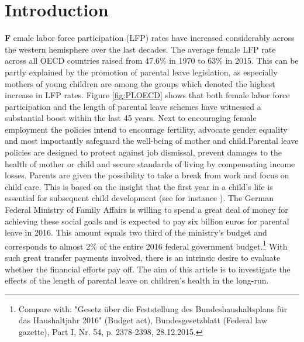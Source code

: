 \documentclass[a4paper ]{article}
\begin{document}
\section{Introduction}
\lettrine[lines=2]{\color{gray}\textbf{F}}{ }emale labor force participation (LFP) rates have increased considerably across the western hemisphere over the last decades. The average female LFP rate across all OECD countries raised from 47.6\% in 1970 to 63\% in 2015. This can be partly explained by the promotion of parental leave legislation, as especially mothers of young children are among the groups which denoted the highest increase in LFP rates. Figure \ref{fig:PLOECD} shows that both female labor force participation and the length of parental leave schemes have witnessed a substantial boost within the last 45 years. Next to encouraging female employment the policies intend to encourage fertility, advocate gender equality and most importantly safeguard the well-being of mother and child.\newline Parental leave policies are designed to protect against job dismissal, prevent damages to the health of mother or child and secure standards of living by compensating income losses. Parents are given the possibility to take a break from work and focus on child care. This is based on the insight that the first year in a child's life is essential for subsequent child development (see for instance \cite{flavell1993cognitive}). \newline The German Federal Ministry of Family Affairs is willing to spend a great deal of money for achieving these social goals and is expected to pay six billion euros for parental leave in 2016. This amount equals two third of the ministry's budget and corresponds to almost 2\% of the entire 2016 federal government budget.\footnote{Compare with: "Gesetz über die Feststellung des Bundeshaushaltsplans für das Haushaltjahr 2016" (Budget act), Bundesgesetzblatt (Federal law gazette), Part I, Nr. 54, p. 2378-2398, 28.12.2015.} With such great transfer payments involved, there is an intrinsic desire to evaluate whether the financial efforts pay off. The aim of this article is to investigate the effects of the length of parental leave on children's health in the long-run. \newline
\end{document}
